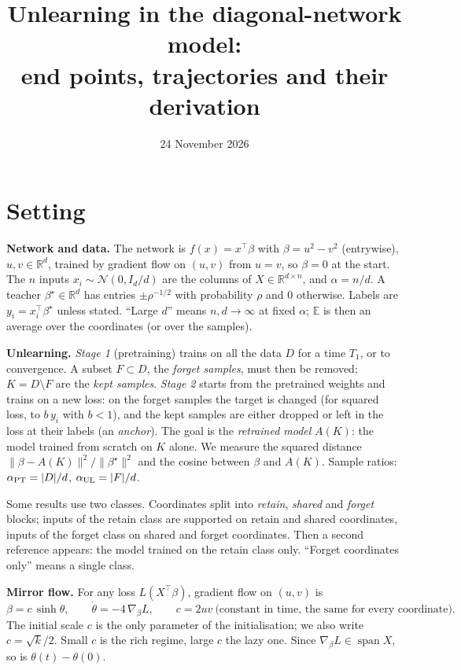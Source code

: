\documentclass[10pt]{article}
\title{Unlearning in the diagonal-network model:\\ end points, trajectories and their derivation}
\author{}\date{24 November 2026}
\newcommand{\bs}{\beta^\star}\newcommand{\E}{\mathbb E}\newcommand{\asinh}{\operatorname{arcsinh}}\newcommand{\prox}{\operatorname{prox}}
\begin{document}
\maketitle

\section{Setting}
\textbf{Network and data.} The network is $f(x)=x^\top\beta$ with $\beta=u^2-v^2$ (entrywise), $u,v\in\mathbb R^d$, trained by gradient flow on $(u,v)$ from $u=v$, so $\beta=0$ at the start. The $n$ inputs $x_i\sim\mathcal N(0,I_d/d)$ are the columns of $X\in\mathbb R^{d\times n}$, and $\alpha=n/d$. A teacher $\bs\in\mathbb R^d$ has entries $\pm\rho^{-1/2}$ with probability $\rho$ and $0$ otherwise. Labels are $y_i=x_i^\top\bs$ unless stated. ``Large $d$'' means $n,d\to\infty$ at fixed $\alpha$; $\E$ is then an average over the coordinates (or over the samples).

\textbf{Unlearning.} \emph{Stage 1} (pretraining) trains on all the data $D$ for a time $T_1$, or to convergence. A subset $F\subset D$, the \emph{forget samples}, must then be removed; $K=D\setminus F$ are the \emph{kept samples}. \emph{Stage 2} starts from the pretrained weights and trains on a new loss: on the forget samples the target is changed (for squared loss, to $b\,y_i$ with $b<1$), and the kept samples are either dropped or left in the loss at their labels (an \emph{anchor}). The goal is the \emph{retrained model} $A(K)$: the model trained from scratch on $K$ alone. We measure the squared distance $\|\beta-A(K)\|^2/\|\bs\|^2$ and the cosine between $\beta$ and $A(K)$. Sample ratios: $\alpha_{\rm PT}=|D|/d$, $\alpha_{\rm UL}=|F|/d$.

Some results use two classes. Coordinates split into \emph{retain}, \emph{shared} and \emph{forget} blocks; inputs of the retain class are supported on retain and shared coordinates, inputs of the forget class on shared and forget coordinates. Then a second reference appears: the model trained on the retain class only. ``Forget coordinates only'' means a single class.

\textbf{Mirror flow.} For any loss $L(X^\top\beta)$, gradient flow on $(u,v)$ is
\begin{equation}\label{T1}
\beta=c\,\sinh\theta,\qquad \dot\theta=-4\,\nabla_\beta L ,\qquad c=2uv\ \text{(constant in time, the same for every coordinate)}.
\end{equation}
The initial scale $c$ is the only parameter of the initialisation; we also write $c=\sqrt k/2$. Small $c$ is the rich regime, large $c$ the lazy one. Since $\nabla_\beta L\in\operatorname{span}X$, so is $\theta(t)-\theta(0)$.
\end{document}
